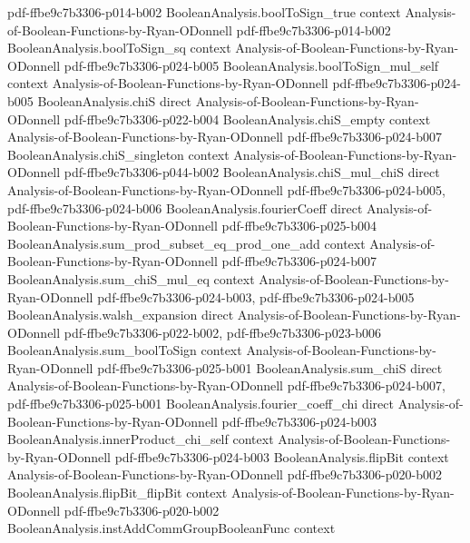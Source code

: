 \begin{theorem}
  {pdf-ffbe9c7b3306-p014-b002}
\proofstep
  {BooleanAnalysis.boolToSign_true}
  {context}
  {Analysis-of-Boolean-Functions-by-Ryan-ODonnell}
  {pdf-ffbe9c7b3306-p014-b002}
\proofstep
  {BooleanAnalysis.boolToSign_sq}
  {context}
  {Analysis-of-Boolean-Functions-by-Ryan-ODonnell}
  {pdf-ffbe9c7b3306-p024-b005}
\proofstep
  {BooleanAnalysis.boolToSign_mul_self}
  {context}
  {Analysis-of-Boolean-Functions-by-Ryan-ODonnell}
  {pdf-ffbe9c7b3306-p024-b005}
\proofstep
  {BooleanAnalysis.chiS}
  {direct}
  {Analysis-of-Boolean-Functions-by-Ryan-ODonnell}
  {pdf-ffbe9c7b3306-p022-b004}
\proofstep
  {BooleanAnalysis.chiS_empty}
  {context}
  {Analysis-of-Boolean-Functions-by-Ryan-ODonnell}
  {pdf-ffbe9c7b3306-p024-b007}
\proofstep
  {BooleanAnalysis.chiS_singleton}
  {context}
  {Analysis-of-Boolean-Functions-by-Ryan-ODonnell}
  {pdf-ffbe9c7b3306-p044-b002}
\proofstep
  {BooleanAnalysis.chiS_mul_chiS}
  {direct}
  {Analysis-of-Boolean-Functions-by-Ryan-ODonnell}
  {pdf-ffbe9c7b3306-p024-b005,
    pdf-ffbe9c7b3306-p024-b006}
\proofstep
  {BooleanAnalysis.fourierCoeff}
  {direct}
  {Analysis-of-Boolean-Functions-by-Ryan-ODonnell}
  {pdf-ffbe9c7b3306-p025-b004}
\proofstep
  {BooleanAnalysis.sum_prod_subset_eq_prod_one_add}
  {context}
  {Analysis-of-Boolean-Functions-by-Ryan-ODonnell}
  {pdf-ffbe9c7b3306-p024-b007}
\proofstep
  {BooleanAnalysis.sum_chiS_mul_eq}
  {context}
  {Analysis-of-Boolean-Functions-by-Ryan-ODonnell}
  {pdf-ffbe9c7b3306-p024-b003,
    pdf-ffbe9c7b3306-p024-b005}
\proofstep
  {BooleanAnalysis.walsh_expansion}
  {direct}
  {Analysis-of-Boolean-Functions-by-Ryan-ODonnell}
  {pdf-ffbe9c7b3306-p022-b002,
    pdf-ffbe9c7b3306-p023-b006}
\proofstep
  {BooleanAnalysis.sum_boolToSign}
  {context}
  {Analysis-of-Boolean-Functions-by-Ryan-ODonnell}
  {pdf-ffbe9c7b3306-p025-b001}
\proofstep
  {BooleanAnalysis.sum_chiS}
  {direct}
  {Analysis-of-Boolean-Functions-by-Ryan-ODonnell}
  {pdf-ffbe9c7b3306-p024-b007,
    pdf-ffbe9c7b3306-p025-b001}
\proofstep
  {BooleanAnalysis.fourier_coeff_chi}
  {direct}
  {Analysis-of-Boolean-Functions-by-Ryan-ODonnell}
  {pdf-ffbe9c7b3306-p024-b003}
\proofstep
  {BooleanAnalysis.innerProduct_chi_self}
  {context}
  {Analysis-of-Boolean-Functions-by-Ryan-ODonnell}
  {pdf-ffbe9c7b3306-p024-b003}
\proofstep
  {BooleanAnalysis.flipBit}
  {context}
  {Analysis-of-Boolean-Functions-by-Ryan-ODonnell}
  {pdf-ffbe9c7b3306-p020-b002}
\proofstep
  {BooleanAnalysis.flipBit_flipBit}
  {context}
  {Analysis-of-Boolean-Functions-by-Ryan-ODonnell}
  {pdf-ffbe9c7b3306-p020-b002}
\proofstep
  {BooleanAnalysis.instAddCommGroupBooleanFunc}
  {context}

\end{theorem}
